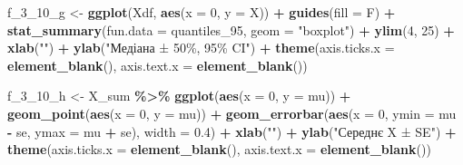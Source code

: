\documentclass[
  11pt,
]{book}
\newenvironment{Shaded}{\begin{snugshade}}{\end{snugshade}}
\newcommand{\AttributeTok}[1]{\textcolor[rgb]{0.13,0.29,0.53}{#1}}
\newcommand{\DecValTok}[1]{\textcolor[rgb]{0.00,0.00,0.81}{#1}}
\newcommand{\FloatTok}[1]{\textcolor[rgb]{0.00,0.00,0.81}{#1}}
\newcommand{\FunctionTok}[1]{\textcolor[rgb]{0.13,0.29,0.53}{\textbf{#1}}}
\newcommand{\NormalTok}[1]{#1}
\newcommand{\OtherTok}[1]{\textcolor[rgb]{0.56,0.35,0.01}{#1}}
\newcommand{\SpecialCharTok}[1]{\textcolor[rgb]{0.81,0.36,0.00}{\textbf{#1}}}
\newcommand{\StringTok}[1]{\textcolor[rgb]{0.31,0.60,0.02}{#1}}
\begin{document}
\begin{Shaded}
\begin{Highlighting}[]
\NormalTok{f\_3\_10\_g }\OtherTok{\textless{}{-}} \FunctionTok{ggplot}\NormalTok{(Xdf, }\FunctionTok{aes}\NormalTok{(}\AttributeTok{x =} \DecValTok{0}\NormalTok{, }\AttributeTok{y =}\NormalTok{ X)) }\SpecialCharTok{+}
    \FunctionTok{guides}\NormalTok{(}\AttributeTok{fill =}\NormalTok{ F) }\SpecialCharTok{+}
    \FunctionTok{stat\_summary}\NormalTok{(}\AttributeTok{fun.data =}\NormalTok{ quantiles\_95, }\AttributeTok{geom =} \StringTok{"boxplot"}\NormalTok{) }\SpecialCharTok{+}
  \FunctionTok{ylim}\NormalTok{(}\DecValTok{4}\NormalTok{, }\DecValTok{25}\NormalTok{) }\SpecialCharTok{+}
  \FunctionTok{xlab}\NormalTok{(}\StringTok{""}\NormalTok{) }\SpecialCharTok{+} \FunctionTok{ylab}\NormalTok{(}\StringTok{"Медіана ± 50\%, 95\% CI"}\NormalTok{) }\SpecialCharTok{+}
  \FunctionTok{theme}\NormalTok{(}\AttributeTok{axis.ticks.x =} \FunctionTok{element\_blank}\NormalTok{(),}
        \AttributeTok{axis.text.x =} \FunctionTok{element\_blank}\NormalTok{())}

\NormalTok{f\_3\_10\_h }\OtherTok{\textless{}{-}}\NormalTok{ X\_sum }\SpecialCharTok{\%\textgreater{}\%} 
  \FunctionTok{ggplot}\NormalTok{(}\FunctionTok{aes}\NormalTok{(}\AttributeTok{x =} \DecValTok{0}\NormalTok{, }\AttributeTok{y =}\NormalTok{ mu)) }\SpecialCharTok{+} 
  \FunctionTok{geom\_point}\NormalTok{(}\FunctionTok{aes}\NormalTok{(}\AttributeTok{x =} \DecValTok{0}\NormalTok{, }\AttributeTok{y =}\NormalTok{ mu)) }\SpecialCharTok{+}
  \FunctionTok{geom\_errorbar}\NormalTok{(}\FunctionTok{aes}\NormalTok{(}\AttributeTok{x =} \DecValTok{0}\NormalTok{, }\AttributeTok{ymin =}\NormalTok{ mu }\SpecialCharTok{{-}}\NormalTok{ se, }\AttributeTok{ymax =}\NormalTok{ mu }\SpecialCharTok{+}\NormalTok{ se), }
                \AttributeTok{width =} \FloatTok{0.4}\NormalTok{) }\SpecialCharTok{+}
  \FunctionTok{xlab}\NormalTok{(}\StringTok{""}\NormalTok{) }\SpecialCharTok{+} \FunctionTok{ylab}\NormalTok{(}\StringTok{"Середнє X ± SE"}\NormalTok{) }\SpecialCharTok{+}
  \FunctionTok{theme}\NormalTok{(}\AttributeTok{axis.ticks.x =} \FunctionTok{element\_blank}\NormalTok{(),}
        \AttributeTok{axis.text.x =} \FunctionTok{element\_blank}\NormalTok{())}


\end{Highlighting}
\end{Shaded}
\end{document}
